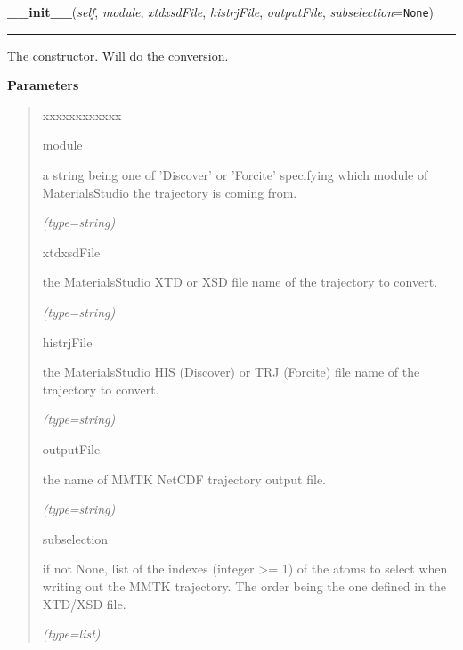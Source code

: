 \hspace{.8\funcindent}\begin{boxedminipage}{\funcwidth}

    \raggedright \textbf{\_\_init\_\_}(\textit{self}, \textit{module}, \textit{xtdxsdFile}, \textit{histrjFile}, \textit{outputFile}, \textit{subselection}={\tt None})

    \vspace{-1.5ex}

    \rule{\textwidth}{0.5\fboxrule}
\setlength{\parskip}{2ex}
    The constructor. Will do the conversion.

\setlength{\parskip}{1ex}
      \textbf{Parameters}
      \vspace{-1ex}

      \begin{quote}
        \begin{Ventry}{xxxxxxxxxxxx}

          \item[module]

          a string being one of 'Discover' or 'Forcite' specifying which 
          module of MaterialsStudio the trajectory is coming from.

            {\it (type=string)}

          \item[xtdxsdFile]

          the MaterialsStudio XTD or XSD file name of the trajectory to 
          convert.

            {\it (type=string)}

          \item[histrjFile]

          the MaterialsStudio HIS (Discover) or TRJ (Forcite) file name of 
          the trajectory to convert.

            {\it (type=string)}

          \item[outputFile]

          the name of MMTK NetCDF trajectory output file.

            {\it (type=string)}

          \item[subselection]

          if not None, list of the indexes (integer {\textgreater}= 1) of 
          the atoms to select when writing out the MMTK trajectory. The 
          order being the one defined in the XTD/XSD file.

            {\it (type=list)}

        \end{Ventry}

      \end{quote}

    \end{boxedminipage}

